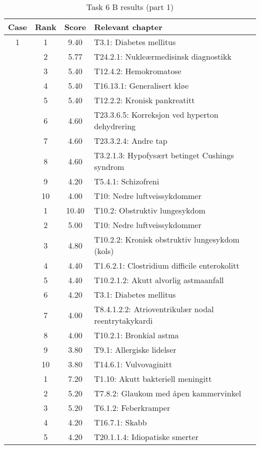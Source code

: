 \begin{table}[htbp] \footnotesize \center
\caption{Task 6 B results (part 1)\label{tab:task6b1}}
\begin{tabular}{c c c l}
    \toprule
    Case & Rank & Score & Relevant chapter \\
    \midrule
    1 & 1 & 9.40 & T3.1: Diabetes mellitus \\
     & 2 & 5.77 & T24.2.1: Nukleærmedisinsk diagnostikk \\
     & 3 & 5.40 & T12.4.2: Hemokromatose \\
     & 4 & 5.40 & T16.13.1: Generalisert kløe \\
     & 5 & 5.40 & T12.2.2: Kronisk pankreatitt \\
     & 6 & 4.60 & T23.3.6.5: Korreksjon ved hyperton dehydrering \\
     & 7 & 4.60 & T23.3.2.4: Andre tap \\
     & 8 & 4.60 & T3.2.1.3: Hypofysært betinget Cushings syndrom \\
     & 9 & 4.20 & T5.4.1: Schizofreni \\
     & 10 & 4.00 & T10: Nedre luftveissykdommer \\
	\addlinespace
    2 & 1 & 10.40 & T10.2: Obstruktiv lungesykdom \\
     & 2 & 5.00 & T10: Nedre luftveissykdommer \\
     & 3 & 4.80 & T10.2.2: Kronisk obstruktiv lungesykdom (kols) \\
     & 4 & 4.40 & T1.6.2.1: Clostridium difficile enterokolitt \\
     & 5 & 4.40 & T10.2.1.2: Akutt alvorlig astmaanfall \\
     & 6 & 4.20 & T3.1: Diabetes mellitus \\
     & 7 & 4.00 & T8.4.1.2.2: Atrioventrikulær nodal reentrytakykardi \\
     & 8 & 4.00 & T10.2.1: Bronkial astma \\
     & 9 & 3.80 & T9.1: Allergiske lidelser \\
     & 10 & 3.80 & T14.6.1: Vulvovaginitt \\
	\addlinespace
    3 & 1 & 7.20 & T1.10: Akutt bakteriell meningitt \\
     & 2 & 5.20 & T7.8.2: Glaukom med åpen kammervinkel \\
     & 3 & 5.20 & T6.1.2: Feberkramper \\
     & 4 & 4.20 & T16.7.1: Skabb \\
     & 5 & 4.20 & T20.1.1.4: Idiopatiske smerter \\

\end{tabular}
\end{table}
